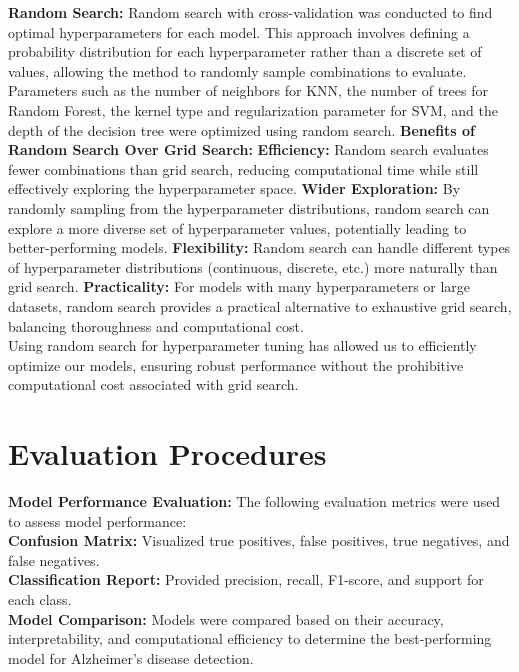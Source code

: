 \documentclass[a4paper,12pt]{report}
\begin{document}
\textbf{Random Search:}
Random search with cross-validation was conducted to find optimal hyperparameters for each model. This approach involves defining a probability distribution for each hyperparameter rather than a discrete set of values, allowing the method to randomly sample combinations to evaluate. Parameters such as the number of neighbors for KNN, the number of trees for Random Forest, the kernel type and regularization parameter for SVM, and the depth of the decision tree were optimized using random search.
{}
\newline\textbf{Benefits of Random Search Over Grid Search:}
{}
   \newline\textbf{Efficiency:} Random search evaluates fewer combinations than grid search, reducing computational time while still effectively exploring the hyperparameter space.
{}
     \newline\textbf{Wider Exploration:} By randomly sampling from the hyperparameter distributions, random search can explore a more diverse set of hyperparameter values, potentially leading to better-performing models.
{}
    \newline\textbf{Flexibility:} Random search can handle different types of hyperparameter distributions (continuous, discrete, etc.) more naturally than grid search.
{}
    \newline\textbf{Practicality:} For models with many hyperparameters or large datasets, random search provides a practical alternative to exhaustive grid search, balancing thoroughness and computational cost.\\
{}
{}
\newline Using random search for hyperparameter tuning has allowed us to efficiently optimize our models, ensuring robust performance without the prohibitive computational cost associated with grid search.


\section{Evaluation Procedures}
\textbf{Model Performance Evaluation:} The following evaluation metrics were used to assess model performance:\\
         \textbf{Confusion Matrix:} Visualized true positives, false positives, true negatives, and false negatives.\\
         \textbf{Classification Report:} Provided precision, recall, F1-score, and support for each class.\\
\textbf{Model Comparison:} Models were compared based on their accuracy, interpretability, and computational efficiency to determine the best-performing model for Alzheimer's disease detection.
\end{document}
